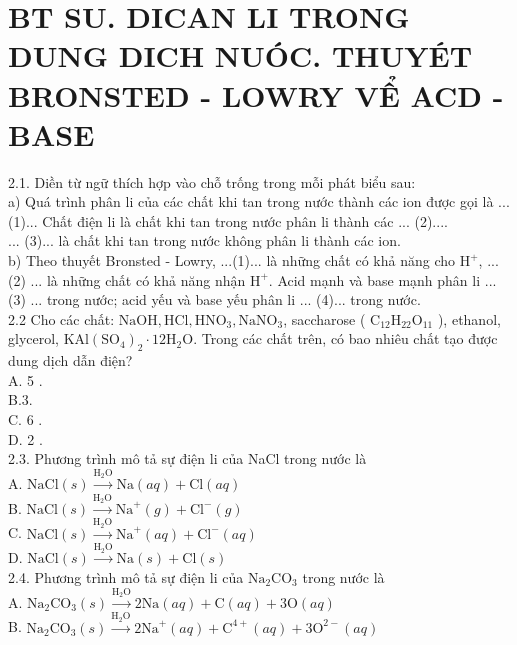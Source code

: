 \documentclass[10pt]{article}
\begin{document}
\section*{BT SU. DICAN LI TRONG DUNG DICH NUÓC. THUYÉT BRONSTED - LOWRY VỂ ACD - BASE}
2.1. Diền từ ngữ thích hợp vào chỗ trống trong mỗi phát biểu sau:\\
a) Quá trình phân li của các chất khi tan trong nước thành các ion được gọi là ... (1)... Chất điện li là chất khi tan trong nước phân li thành các ... (2)....\\
... (3)... là chất khi tan trong nước không phân li thành các ion.\\
b) Theo thuyết Bronsted - Lowry, ...(1)... là những chất có khả năng cho $\mathrm{H}^{+}$, ... (2) ... là những chất có khả năng nhận $\mathrm{H}^{+}$. Acid mạnh và base mạnh phân li ... (3) ... trong nước; acid yếu và base yếu phân li ... (4)... trong nước.\\
2.2 Cho các chất: $\mathrm{NaOH}, \mathrm{HCl}, \mathrm{HNO}_{3}, \mathrm{NaNO}_{3}$, saccharose ( $\mathrm{C}_{12} \mathrm{H}_{22} \mathrm{O}_{11}$ ), ethanol, glycerol, $\mathrm{KAl}\left(\mathrm{SO}_{4}\right)_{2} \cdot 12 \mathrm{H}_{2} \mathrm{O}$. Trong các chất trên, có bao nhiêu chất tạo được dung dịch dẫn điện?\\
A. 5 .\\
B.3.\\
C. 6 .\\
D. 2 .\\
2.3. Phương trình mô tả sự điện li của NaCl trong nước là\\
A. $\mathrm{NaCl}(s) \xrightarrow{\mathrm{H}_{2} \mathrm{O}} \mathrm{Na}(a q)+\mathrm{Cl}(a q)$\\
B. $\mathrm{NaCl}(s) \xrightarrow{\mathrm{H}_{2} \mathrm{O}} \mathrm{Na}^{+}(g)+\mathrm{Cl}^{-}(g)$\\
C. $\mathrm{NaCl}(s) \xrightarrow{\mathrm{H}_{2} \mathrm{O}} \mathrm{Na}^{+}(a q)+\mathrm{Cl}^{-}(a q)$\\
D. $\mathrm{NaCl}(s) \xrightarrow{\mathrm{H}_{2} \mathrm{O}} \mathrm{Na}(s)+\mathrm{Cl}(s)$\\
2.4. Phương trình mô tả sự điện li của $\mathrm{Na}_{2} \mathrm{CO}_{3}$ trong nước là\\
A. $\mathrm{Na}_{2} \mathrm{CO}_{3}(s) \xrightarrow{\mathrm{H}_{2} \mathrm{O}} 2 \mathrm{Na}(a q)+\mathrm{C}(a q)+3 \mathrm{O}(a q)$\\
B. $\mathrm{Na}_{2} \mathrm{CO}_{3}(s) \xrightarrow{\mathrm{H}_{2} \mathrm{O}} 2 \mathrm{Na}^{+}(a q)+\mathrm{C}^{4+}(a q)+3 \mathrm{O}^{2-}(a q)$\\
\end{document}
